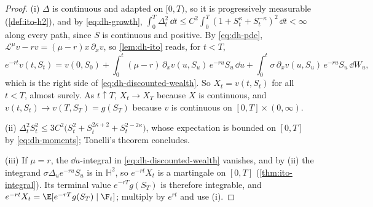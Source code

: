 \begin{proof}
(i) $\Delta$ is continuous and adapted on $[0,T)$, so it is progressively measurable
(\cref{def:ito-h2}), and by \eqref{eq:dh-growth},
$\int_0^T\Delta_t^2\,\dd t\le C^2\int_0^T(1+S_t^\kappa+S_t^{-\kappa})^2\,\dd t<\infty$ along every path,
since $S$ is continuous and positive. By \eqref{eq:dh-pde},
$\mathcal L^\mu v-rv=(\mu-r)x\,\partial_xv$, so \cref{lem:dh-ito} reads, for $t<T$,
\[
  e^{-rt}v(t,S_t)=v(0,S_0)+\int_0^t(\mu-r)\,\partial_xv(u,S_u)\,e^{-ru}S_u\,\dd u
  +\int_0^t\sigma\,\partial_xv(u,S_u)\,e^{-ru}S_u\,\dd W_u ,
\]
which is the right side of \eqref{eq:dh-discounted-wealth}. So $X_t=v(t,S_t)$ for all $t<T$,
almost surely. As $t\uparrow T$, $X_t\to X_T$ because $X$ is continuous, and
$v(t,S_t)\to v(T,S_T)=g(S_T)$ because $v$ is continuous on $[0,T]\times(0,\infty)$.

(ii) $\Delta_t^2S_t^2\le3C^2\big(S_t^2+S_t^{2\kappa+2}+S_t^{2-2\kappa}\big)$, whose expectation is bounded
on $[0,T]$ by \eqref{eq:dh-moments}; Tonelli's theorem concludes.

(iii) If $\mu=r$, the $\dd u$-integral in \eqref{eq:dh-discounted-wealth} vanishes, and by (ii)
the integrand $\sigma\Delta_ue^{-ru}S_u$ is in $\mathbb H^2$, so $e^{-rt}X_t$ is a martingale
on $[0,T]$ (\cref{thm:ito-integral}). Its terminal value $e^{-rT}g(S_T)$ is therefore
integrable, and $e^{-rt}X_t=\E[e^{-rT}g(S_T)\mid\F_t]$; multiply by $e^{rt}$ and use (i).
\end{proof}

